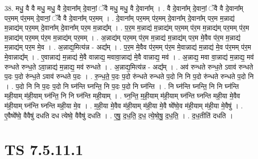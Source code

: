 \documentclass[17pt]{extarticle}
\begin{document}
38. मधु॒ वै वै मधु॒ मधु॒ वै दे॒वाना᳚म् दे॒वानां॒ ॅवै मधु॒ मधु॒ वै दे॒वाना᳚म् । . वै दे॒वाना᳚म् दे॒वानां॒ ॅवै वै दे॒वाना᳚म् पर॒मम् प॑र॒मम् दे॒वानां॒ ॅवै वै दे॒वाना᳚म् पर॒मम् । . दे॒वाना᳚म् पर॒मम् प॑र॒मम् दे॒वाना᳚म् दे॒वाना᳚म् पर॒म म॒न्नाद्य॑ म॒न्नाद्य॑म् पर॒मम् दे॒वाना᳚म् दे॒वाना᳚म् पर॒म म॒न्नाद्य᳚म् । . प॒र॒म म॒न्नाद्य॑ म॒न्नाद्य॑म् पर॒मम् प॑र॒म म॒न्नाद्य॑म् पर॒मम् प॑र॒म म॒न्नाद्य॑म् पर॒मम् प॑र॒म म॒न्नाद्य॑म् पर॒मम् । . अ॒न्नाद्य॑म् पर॒मम् प॑र॒म म॒न्नाद्य॑ म॒न्नाद्य॑म् पर॒म मे॒वैव प॑र॒म म॒न्नाद्य॑ म॒न्नाद्य॑म् पर॒म मे॒व । . अ॒न्नाद्य॒मित्य॑न्न - अद्य᳚म् । . प॒र॒म मे॒वैव प॑र॒मम् प॑र॒म मे॒वान्नाद्य॑ म॒न्नाद्य॑ मे॒व प॑र॒मम् प॑र॒म मे॒वान्नाद्य᳚म् । . ए॒वान्नाद्य॑ म॒न्नाद्य॑ मे॒वै वान्नाद्य॒ मवावा॒न्नाद्य॑ मे॒वै वान्नाद्य॒ मव॑ । . अ॒न्नाद्य॒ मवा वा॒न्नाद्य॑ म॒न्नाद्य॒ मव॑ रुन्धते रुन्ध॒ते ऽवा॒न्नाद्य॑ म॒न्नाद्य॒ मव॑ रुन्धते । . अ॒न्नाद्य॒मित्य॑न्न - अद्य᳚म् । . अव॑ रुन्धते रुन्ध॒ते ऽवाव॑ रुन्धते प॒दः प॒दो रु॑न्ध॒ते ऽवाव॑ रुन्धते प॒दः । . रु॒न्ध॒ते॒ प॒दः प॒दो रु॑न्धते रुन्धते प॒दो नि नि प॒दो रु॑न्धते रुन्धते प॒दो नि । . प॒दो नि नि प॒दः प॒दो नि घ्न॑न्ति घ्नन्ति॒ नि प॒दः प॒दो नि घ्न॑न्ति । . नि घ्न॑न्ति घ्नन्ति॒ नि नि घ्न॑न्ति मही॒याम् म॑ही॒याम् घ्न॑न्ति॒ नि नि घ्न॑न्ति मही॒याम् । . घ्न॒न्ति॒ म॒ही॒याम् म॑ही॒याम् घ्न॑न्ति घ्नन्ति मही॒या मे॒वैव म॑ही॒याम् घ्न॑न्ति घ्नन्ति मही॒या मे॒व । . म॒ही॒या मे॒वैव म॑ही॒याम् म॑ही॒या मे॒वै ष्वे᳚ष्वे॒व म॑ही॒याम् म॑ही॒या मे॒वैषु॑ । . ए॒वैष्वे᳚ष्वे॒ वैवैषु॑ दधति दध त्येष्वे॒ वैवैषु॑ दधति । . ए॒षु॒ द॒ध॒ति॒ द॒ध॒ त्ये॒ष्वे॒षु॒ द॒ध॒ति॒ । . द॒ध॒तीति॑ दधति । \newline
\pagebreak
{}

\section{ TS 7.5.11.1 }
\end{document}
